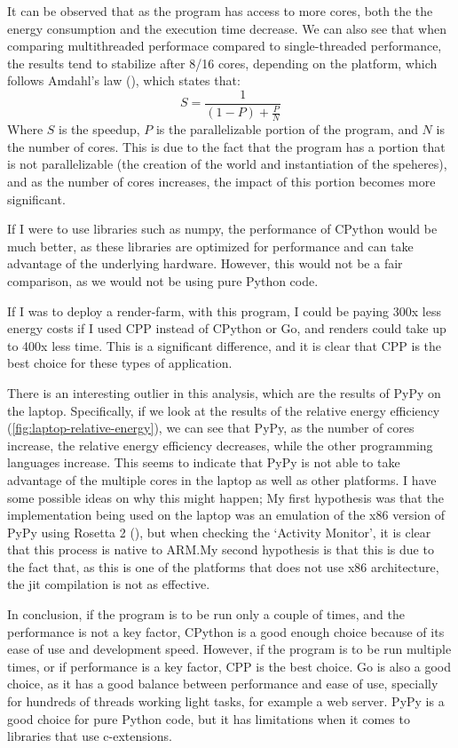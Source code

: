 It can be observed that as the program has access to more cores, both the the energy consumption and the execution time decrease. We can also see that when comparing multithreaded performace compared to single-threaded performance, the results tend to stabilize after 8/16 cores, depending on the platform, which follows Amdahl's law (\cite{amdahl:law}), which states that: 
$$
S = \frac{1}{(1 - P) + \frac{P}{N}}
$$
Where $S$ is the speedup, $P$ is the parallelizable portion of the program, and $N$ is the number of cores. This is due to the fact that the program has a portion that is not parallelizable (the creation of the world and instantiation of the speheres), and as the number of cores increases, the impact of this portion becomes more significant.

If I were to use libraries such as \Gls{numpy}, the performance of \gls{CPython} would be much better, as these libraries are optimized for performance and can take advantage of the underlying hardware. However, this would not be a fair comparison, as we would not be using pure Python code.

If I was to deploy a render-farm, with this program, I could be paying 300x less energy costs if I used \gls{CPP} instead of \gls{CPython} or Go, and renders could take up to 400x less time. This is a significant difference, and it is clear that \gls{CPP} is the best choice for these types of application.

There is an interesting outlier in this analysis, which are the results of PyPy on the laptop. Specifically, if we look at the results of the relative energy efficiency (\autoref{fig:laptop-relative-energy}), we can see that PyPy, as the number of cores increase, the relative energy efficiency decreases, while the other programming languages increase. This seems to indicate that PyPy is not able to take advantage of the multiple cores in the laptop as well as other platforms. I have some possible ideas on why this might happen; My first hypothesis was that the implementation being used on the laptop was an emulation of the x86 version of PyPy using Rosetta 2 (\cite{apple:rosetta2}), but when checking the `Activity Monitor', it is clear that this process is native to \gls{ARM}.\@ My second hypothesis is that this is due to the fact that, as this is one of the platforms that does not use x86 architecture, the \gls{jit} compilation is not as effective.


In conclusion, if the program is to be run only a couple of times, and the performance is not a key factor, \gls{CPython} is a good enough choice because of its ease of use and development speed. However, if the program is to be run multiple times, or if performance is a key factor, \gls{CPP} is the best choice. Go is also a good choice, as it has a good balance between performance and ease of use, specially for hundreds of threads working light tasks, for example a web server. PyPy is a good choice for pure Python code, but it has limitations when it comes to libraries that use \glspl{c-extension}.

